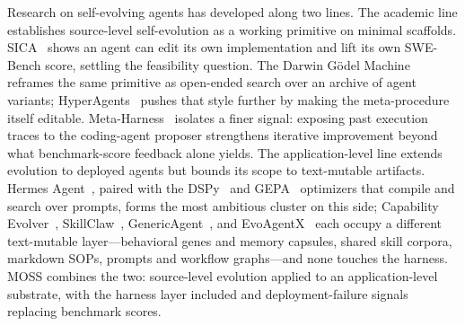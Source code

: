 Research on self-evolving agents has developed along two lines. The academic line establishes source-level self-evolution as a working primitive on minimal scaffolds. SICA~\citep{robeyns2025self} shows an agent can edit its own implementation and lift its own SWE-Bench score, settling the feasibility question. The Darwin G\"{o}del Machine~\citep{zhang2025darwin} reframes the same primitive as open-ended search over an archive of agent variants; HyperAgents~\citep{zhang2026hyperagents} pushes that style further by making the meta-procedure itself editable. Meta-Harness~\citep{lee2026meta} isolates a finer signal: exposing past execution traces to the coding-agent proposer strengthens iterative improvement beyond what benchmark-score feedback alone yields. The application-level line extends evolution to deployed agents but bounds its scope to text-mutable artifacts. Hermes Agent~\citep{hermes-github}, paired with the DSPy~\citep{khattab2023dspy} and GEPA~\citep{agrawal2025gepa} optimizers that compile and search over prompts, forms the most ambitious cluster on this side; Capability Evolver~\citep{wang2026procedural}, SkillClaw~\citep{ma2026skillclaw}, GenericAgent~\citep{liang2026genericagent}, and EvoAgentX~\citep{wang2025evoagentx} each occupy a different text-mutable layer---behavioral genes and memory capsules, shared skill corpora, markdown SOPs, prompts and workflow graphs---and none touches the harness. MOSS combines the two: source-level evolution applied to an application-level substrate, with the harness layer included and deployment-failure signals replacing benchmark scores.

